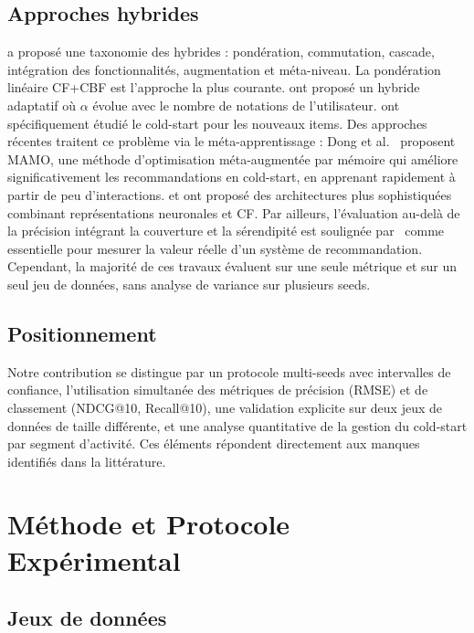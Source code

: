 \documentclass[conference]{IEEEtran}
\begin{document}
\subsection{Approches hybrides}

\cite{burke2002} a proposé une taxonomie des hybrides : pondération,
commutation, cascade, intégration des fonctionnalités, augmentation et
méta-niveau. La pondération linéaire CF+CBF est l'approche la plus courante.
\cite{claypool1999} ont proposé un hybride adaptatif où $\alpha$ évolue avec
le nombre de notations de l'utilisateur. \cite{ungar2002} ont spécifiquement
étudié le cold-start pour les nouveaux items. Des approches récentes traitent
ce problème via le méta-apprentissage : Dong et al.~\cite{dong2020} proposent
MAMO, une méthode d'optimisation méta-augmentée par mémoire qui améliore
significativement les recommandations en cold-start, en apprenant rapidement
à partir de peu d'interactions. \cite{wang2019} et
\cite{deldjoo2021} ont proposé des architectures plus sophistiquées combinant
représentations neuronales et CF. Par ailleurs, l'évaluation au-delà de la
précision intégrant la couverture et la sérendipité est soulignée
par~\cite{ge2021} comme essentielle pour mesurer la valeur réelle d'un
système de recommandation. Cependant, la majorité de ces travaux
évaluent sur une seule métrique et sur un seul jeu de données, sans analyse
de variance sur plusieurs seeds.

\subsection{Positionnement}

Notre contribution se distingue par un protocole multi-seeds avec
intervalles de confiance, l'utilisation simultanée des métriques de
précision (RMSE) et de classement (NDCG@10, Recall@10), une validation
explicite sur deux jeux de données de taille différente, et une analyse
quantitative de la gestion du cold-start par segment d'activité. Ces éléments
répondent directement aux manques identifiés dans la littérature.


\section{Méthode et Protocole Expérimental}
\label{sec:method}

\subsection{Jeux de données}
\end{document}
